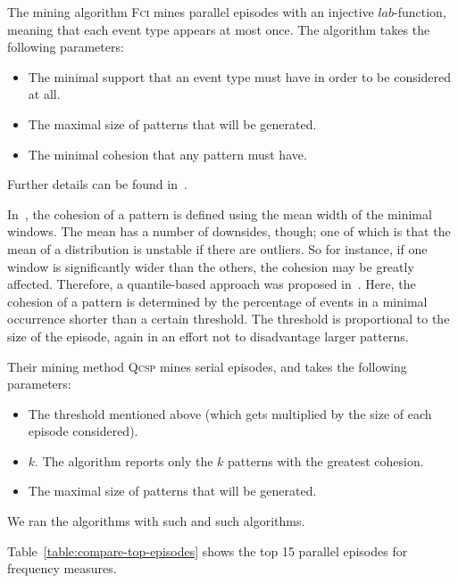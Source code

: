 The mining algorithm \textsc{Fci} mines parallel episodes with an injective $ lab $-function, meaning that each event type appears at most once. The algorithm takes the following parameters:
\begin{itemize}
\item The minimal support that an event type must have in order to be considered at all.
\item The maximal size of patterns that will be generated.
\item The minimal cohesion that any pattern must have.
\end{itemize}
Further details can be found in~\cite{cule2016efficient}.

In~\cite{cule2016efficient}, the cohesion of a pattern is defined using the mean width of the minimal windows. The mean has a number of downsides, though; one of which is that the mean of a distribution is unstable if there are outliers. So for instance, if one window is significantly wider than the others, the cohesion may be greatly affected. Therefore, a quantile-based approach was proposed in~\citep{feremans2018mining}. Here, the cohesion of a pattern is determined by the percentage of events in a minimal occurrence shorter than a certain threshold. The threshold is proportional to the size of the episode, again in an effort not to disadvantage larger patterns.

Their mining method \textsc{Qcsp} mines serial episodes, and takes the following parameters:
\begin{itemize}
\item The threshold mentioned above (which gets multiplied by the size of each episode considered).
\item $ k $. The algorithm reports only the $ k $ patterns with the greatest cohesion.
\item The maximal size of patterns that will be generated.
\end{itemize}

We ran the algorithms with such and such algorithms.

Table~\ref{table:compare-top-episodes} shows the top 15 parallel episodes for frequency measures.

